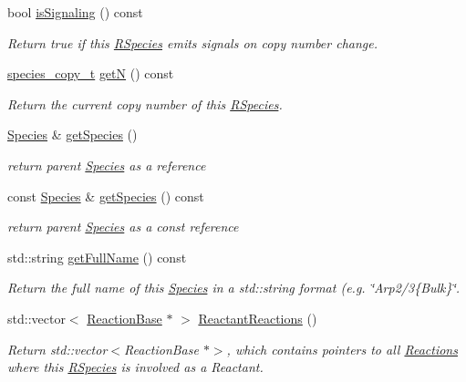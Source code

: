 \begin{DoxyCompactItemize}
bool \hyperlink{classchem_1_1RSpecies_a652a2d0f305a8ab84305ff1dd1fd41b8}{is\-Signaling} () const 
\begin{DoxyCompactList}\small\item\em Return true if this \hyperlink{classchem_1_1RSpecies}{R\-Species} emits signals on copy number change. \end{DoxyCompactList}\item 
\hyperlink{common_8h_a3503f321fd36304ee274141275cca586}{species\-\_\-copy\-\_\-t} \hyperlink{classchem_1_1RSpecies_a5a96cf2a67af375c6471dfa5a21990f8}{get\-N} () const 
\begin{DoxyCompactList}\small\item\em Return the current copy number of this \hyperlink{classchem_1_1RSpecies}{R\-Species}. \end{DoxyCompactList}\item 
\hyperlink{classchem_1_1Species}{Species} \& \hyperlink{classchem_1_1RSpecies_a585ae6da09ba09c824aac7a0fcddd748}{get\-Species} ()
\begin{DoxyCompactList}\small\item\em return parent \hyperlink{classchem_1_1Species}{Species} as a reference \end{DoxyCompactList}\item 
const \hyperlink{classchem_1_1Species}{Species} \& \hyperlink{classchem_1_1RSpecies_a74953c2446c0261fc5732a63e3392a15}{get\-Species} () const 
\begin{DoxyCompactList}\small\item\em return parent \hyperlink{classchem_1_1Species}{Species} as a const reference \end{DoxyCompactList}\item 
std\-::string \hyperlink{classchem_1_1RSpecies_af4e42cfd817f05b2de169275e3496399}{get\-Full\-Name} () const 
\begin{DoxyCompactList}\small\item\em Return the full name of this \hyperlink{classchem_1_1Species}{Species} in a std\-::string format (e.\-g. \char`\"{}\-Arp2/3\{\-Bulk\}\char`\"{}. \end{DoxyCompactList}\item 
std\-::vector$<$ \hyperlink{classchem_1_1ReactionBase}{Reaction\-Base} $\ast$ $>$ \hyperlink{classchem_1_1RSpecies_a777147e17b1ef1e733cd35a1d2aa98ba}{Reactant\-Reactions} ()
\begin{DoxyCompactList}\small\item\em Return std\-::vector$<$\-Reaction\-Base $\ast$$>$, which contains pointers to all \hyperlink{classchem_1_1Reaction}{Reactions} where this \hyperlink{classchem_1_1RSpecies}{R\-Species} is involved as a Reactant. \end{DoxyCompactList}\item 

\end{DoxyCompactItemize}
